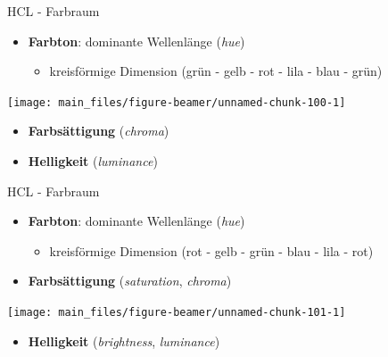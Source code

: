 \documentclass[
  10pt,
  ignorenonframetext,
]{beamer}
\providecommand{\tightlist}{%
  \setlength{\itemsep}{0pt}\setlength{\parskip}{0pt}}
\begin{document}
\begin{frame}{HCL - Farbraum}
\label{hcl---farbraum}
\begin{itemize}
\tightlist
\item
  \textbf{Farbton}: dominante Wellenlänge (\emph{hue})

  \begin{itemize}
  \tightlist
  \item
    kreisförmige Dimension (grün - gelb - rot - lila - blau - grün)
    \scriptsize
  \end{itemize}
\end{itemize}

\begin{center}\texttt{[image: main\_files/figure-beamer/unnamed-chunk-100-1]} \end{center}

\normalsize

\begin{itemize}
\tightlist
\item
  \textbf{Farbsättigung} (\emph{chroma})\\
\item
  \textbf{Helligkeit} (\emph{luminance})
\end{itemize}
\end{frame}

\begin{frame}{HCL - Farbraum}
\label{hcl---farbraum-1}
\begin{itemize}
\tightlist
\item
  \textbf{Farbton}: dominante Wellenlänge (\emph{hue})

  \begin{itemize}
  \tightlist
  \item
    kreisförmige Dimension (rot - gelb - grün - blau - lila - rot)
  \end{itemize}
\item
  \textbf{Farbsättigung} (\emph{saturation}, \emph{chroma})\\
  \scriptsize
\end{itemize}

\begin{center}\texttt{[image: main\_files/figure-beamer/unnamed-chunk-101-1]} \end{center}

\normalsize

\begin{itemize}
\tightlist
\item
  \textbf{Helligkeit} (\emph{brightness}, \emph{luminance})
\end{itemize}
\end{frame}
\end{document}
